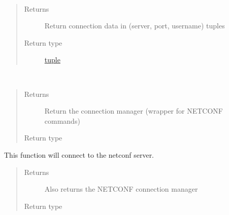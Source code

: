 \documentclass[letterpaper,10pt,english]{sphinxmanual}
\begin{document}
\begin{fulllineitems}
\begin{fulllineitems}
\label{util/netconf:escape.util.netconf.AbstractNETCONFAdapter.connection_data}~\begin{quote}\begin{description}
\item[{Returns}] \leavevmode
Return connection data in (server, port, username) tuples

\item[{Return type}] \leavevmode
\href{https://docs.python.org/2.7/library/functions.html\#tuple}{tuple}

\end{description}\end{quote}

\end{fulllineitems}


\begin{fulllineitems}
\label{util/netconf:escape.util.netconf.AbstractNETCONFAdapter.manager}~\begin{quote}\begin{description}
\item[{Returns}] \leavevmode
Return the connection manager (wrapper for NETCONF commands)

\item[{Return type}] \leavevmode
\href{http://ncclient.readthedocs.org/en/latest/manager.html\#ncclient.manager.Manager}{}

\end{description}\end{quote}

\end{fulllineitems}


\begin{fulllineitems}
\label{util/netconf:escape.util.netconf.AbstractNETCONFAdapter.connect}
This function will connect to the netconf server.
\begin{quote}\begin{description}
\item[{Returns}] \leavevmode
Also returns the NETCONF connection manager

\item[{Return type}] \leavevmode
\href{http://ncclient.readthedocs.org/en/latest/manager.html\#ncclient.manager.Manager}{}


\end{description}
\end{quote}
\end{fulllineitems}
\end{fulllineitems}
\end{document}
